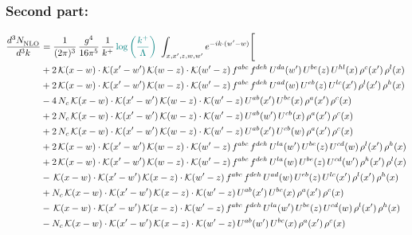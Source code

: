 \documentclass[9pt]{article}
\numberwithin{equation}{section}
\begin{document}
\subsubsection{Second part:}
\begin{align}
\frac{d^{3}N_{\rm NLO}^{\rm}}{d^{3}k}  & = \frac{1}{(2\pi)^{3}}\,\frac{g^{4}}{16\pi^{5}}\,\frac{1}{k^{+}}\,{\color{teal}\log{\left(\frac{k^{+}}{\Lambda}\right)}}\,\,\int_{x,x',z,w,w'}e^{-ik\cdot(w'-w)}\Bigg[\notag\\ &+2\,\mathcal{K}(x-w)\cdot\mathcal{K}(x'-w')\,\mathcal{K}(w-z)\cdot\mathcal{K}(w'-z)\,f^{abc}\,f^{deh}\,U^{da}(w')\,U^{be}(z)\,U^{hl}(x)\,\rho^{c}(x')\,\rho^{l}(x)\notag\\
&+2\,\mathcal{K}(x-w)\cdot\mathcal{K}(x'-w')\,\mathcal{K}(w-z)\cdot\mathcal{K}(w'-z)\,f^{abc}\,f^{deh}\,U^{ad}(w)\,U^{eb}(z)\,U^{lc}(x')\,\rho^{l}(x')\,\rho^{h}(x)\notag\\
&-4\,N_{c}\,\mathcal{K}(x-w)\cdot\mathcal{K}(x'-w')\,\mathcal{K}(w-z)\cdot\mathcal{K}(w'-z)\,U^{ab}(x')\,U^{bc}(x)\,\rho^{a}(x')\,\rho^{c}(x)\notag\\
&+2\,N_{c}\,\mathcal{K}(x-w)\cdot\mathcal{K}(x'-w')\,\mathcal{K}(w-z)\cdot\mathcal{K}(w'-z)\,U^{ab}(w')\,U^{cb}(x)\,\rho^{a}(x')\,\rho^{c}(x)\notag\\
&+2\,N_{c}\,\mathcal{K}(x-w)\cdot\mathcal{K}(x'-w')\,\mathcal{K}(w-z)\cdot\mathcal{K}(w'-z)\,U^{ab}(x')\,U^{cb}(w)\,\rho^{a}(x')\,\rho^{c}(x)\notag\\
&+2\,\mathcal{K}(x-w)\cdot\mathcal{K}(x'-w')\,\mathcal{K}(w-z)\cdot\mathcal{K}(w'-z)\,f^{abc}\,f^{deh}\,U^{la}(w')\,U^{be}(z)\,U^{cd}(w)\,\rho^{l}(x')\,\rho^{h}(x)\notag\\
&+2\,\mathcal{K}(x-w)\cdot\mathcal{K}(x'-w')\,\mathcal{K}(w-z)\cdot\mathcal{K}(w'-z)\,f^{abc}\,f^{deh}\,U^{la}(w)\,U^{be}(z)\,U^{cd}(w')\,\rho^{h}(x')\,\rho^{l}(x)\notag\\
&-\,\mathcal{K}(x-w)\cdot\mathcal{K}(x'-w')\,\mathcal{K}(x-z)\cdot\mathcal{K}(w'-z)\,f^{abc}\,f^{deh}\,U^{ad}(w)\,U^{eb}(z)\,U^{lc}(x')\,\rho^{l}(x')\,\rho^{h}(x)\notag\\
&+N_{c}\,\mathcal{K}(x-w)\cdot\mathcal{K}(x'-w')\,\mathcal{K}(x-z)\cdot\mathcal{K}(w'-z)\,U^{ab}(x')\,U^{bc}(x)\,\rho^{a}(x')\,\rho^{c}(x)\notag\\
&-\,\mathcal{K}(x-w)\cdot\mathcal{K}(x'-w')\,\mathcal{K}(x-z)\cdot\mathcal{K}(w'-z)\,f^{abc}\,f^{deh}\,U^{la}(w')\,U^{be}(z)\,U^{cd}(w)\,\rho^{l}(x')\,\rho^{h}(x)\notag\\
&-N_{c}\,\mathcal{K}(x-w)\cdot\mathcal{K}(x'-w')\,\mathcal{K}(x-z)\cdot\mathcal{K}(w'-z)\,U^{ab}(w')\,U^{bc}(x)\,\rho^{a}(x')\,\rho^{c}(x)\notag\\

\end{align}
\end{document}
